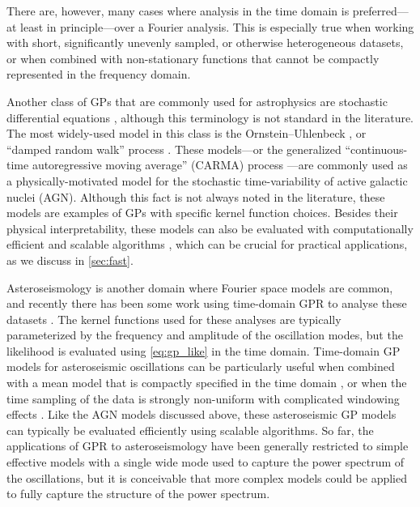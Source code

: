 \documentclass[letterpaper]{ar-1col}
\begin{document}
There are, however, many cases where analysis in the time domain is preferred---at least in principle---over a Fourier analysis.
This is especially true when working with short, significantly unevenly sampled, or otherwise heterogeneous datasets, or when combined with non-stationary functions that cannot be compactly represented in the frequency domain. 

Another class of GPs that are commonly used for astrophysics are stochastic differential equations \citep[see][for a detailed discussion of these models]{Sarkka:2019}, although this terminology is not standard in the literature.
The most widely-used model in this class is the Ornstein--Uhlenbeck \citep{1930PhRv...36..823U}, or ``damped random walk'' process \citep[e.g.,][]{2009ApJ...698..895K, 2012A&A...546A..89B, 2020AJ....160..265H}.
These models---or the generalized ``continuous-time autoregressive moving average'' (CARMA) process \citep[e.g.,][]{2014ApJ...788...33K, celerite, 2022arXiv220108943Y}---are commonly used as a physically-motivated model for the stochastic time-variability of active galactic nuclei (AGN).
Although this fact is not always noted in the literature, these models are examples of GPs with specific kernel function choices.
Besides their physical interpretability, these models can also be evaluated with computationally efficient and scalable algorithms \citep[e.g.,][]{2014ApJ...788...33K, celerite}, which can be crucial for practical applications, as we discuss in \autoref{sec:fast}.

Asteroseismology is another domain where Fourier space models are common, and recently there has been some work using time-domain GPR to analyse these datasets \citep[e.g.,][]{2017AJ....154..254G, 2018ApJ...865L..20F}.
The kernel functions used for these analyses are typically parameterized by the frequency and amplitude of the oscillation modes, but the likelihood is evaluated using \autoref{eq:gp_like} in the time domain.
Time-domain GP models for asteroseismic oscillations can be particularly useful when combined with a mean model that is compactly specified in the time domain \citep[e.g., a transiting planet,][]{2017AJ....154..254G}, or when the time sampling of the data is strongly non-uniform with complicated windowing effects \citep{2018ApJ...865L..20F}.
Like the AGN models discussed above, these asteroseismic GP models can typically be evaluated efficiently using scalable algorithms.
So far, the applications of GPR to asteroseismology have been generally restricted to simple effective models with a single wide mode used to capture the power spectrum of the oscillations, but it is conceivable that more complex models could be applied to fully capture the structure of the power spectrum.
\end{document}
